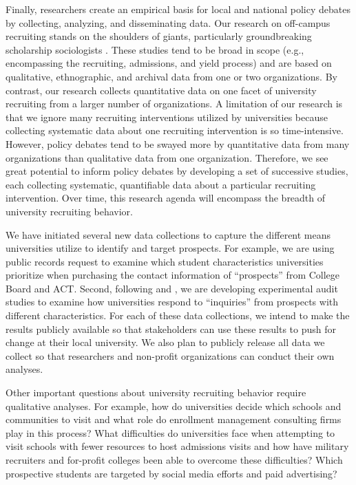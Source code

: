 \documentclass[twoside]{article}
\begin{document}
Finally, researchers create an empirical basis for local and national policy debates by collecting, analyzing, and disseminating data.  Our research on off-campus recruiting stands on the shoulders of giants, particularly groundbreaking scholarship sociologists \citep[e.g., ][]{RN3519,RN4407,RN4324}. These studies tend to be broad in scope (e.g., encompassing the recruiting, admissions, and yield process) and are based on qualitative, ethnographic, and archival data from one or two organizations. By contrast, our research collects quantitative data on one facet of university recruiting from a larger number of organizations. A limitation of our research is that we ignore many recruiting interventions utilized by universities because collecting systematic data about one recruiting intervention is so time-intensive. However, policy debates tend to be swayed more by quantitative data from many organizations than qualitative data from one organization. Therefore, we see great potential to inform policy debates by developing a set of successive studies, each collecting systematic, quantifiable data about a particular recruiting intervention. Over time, this research agenda will encompass the breadth of university recruiting behavior.

We have initiated several new data collections to capture the different means universities utilize to identify and target prospects.  For example, we are using public records request to examine which student characteristics universities prioritize when purchasing the contact information of ``prospects'' from College Board and ACT.  Second, following \cite{RN4331} and \cite{RN4360}, we are developing experimental audit studies to examine how universities respond to ``inquiries'' from prospects with different characteristics. For each of these data collections, we intend to make the results publicly available so that stakeholders can use these results to push for change at their local university. We also plan to publicly release all data we collect so that researchers and non-profit organizations can conduct their own analyses.

Other important questions about university recruiting behavior require qualitative analyses. For example, how do universities decide which schools and communities to visit and what role do enrollment management consulting firms play in this process? What difficulties do universities face when attempting to visit schools with fewer resources to host admissions visits and how have military recruiters and for-profit colleges been able to overcome these difficulties? Which prospective students are targeted by social media efforts and paid advertising?
\end{document}
